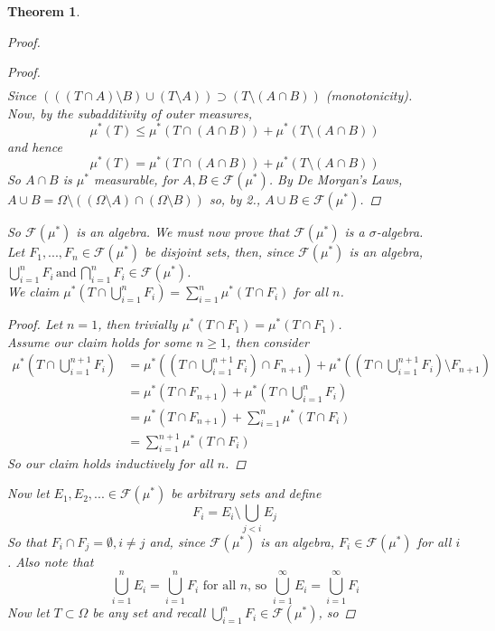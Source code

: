 \documentclass[12pt]{article}
\newtheorem{theorem}{Theorem}
\begin{document}
\begin{theorem}
\begin{proof}
\begin{enumerate}
\begin{proof}
\begin{align*}
					\end{align*}
					Since $(((T \cap A) \setminus B) \cup (T \setminus A)) \supset (T \setminus (A \cap B))$ (monotonicity).\\
					Now, by the subadditivity of outer measures,
					$$\mu^*(T) \le \mu^*(T \cap (A \cap B)) + \mu^*(T \setminus (A \cap B))$$
					and hence
					$$\mu^*(T) = \mu^*(T \cap (A \cap B)) + \mu^*(T \setminus (A \cap B))$$
					So $A \cap B$ is $\mu^*$ measurable, for $A, B \in \mathcal{F}(\mu^*)$.  By \emph{De Morgan's Laws}, $A \cup B = \Omega \setminus ((\Omega \setminus A) \cap (\Omega \setminus B))$ so, by 2., $A \cup B \in \mathcal{F}(\mu^*)$.
			\end{proof}
		\end{enumerate}
		So $\mathcal{F}(\mu^*)$ is an algebra.  We must now prove that $\mathcal{F}(\mu^*)$ is a $\sigma$-algebra.\\[11pt]
		Let $F_1, ... , F_n \in \mathcal{F}(\mu^*)$ be disjoint sets, then, since $\mathcal{F}(\mu^*)$ is an algebra, $\bigcup_{i=1}^n F_i \, \text{and} \, \bigcap_{i=1}^n F_i \in \mathcal{F}(\mu^*)$.\\
		We claim $\mu^*(T \cap \bigcup_{i=1}^n F_i) = \sum_{i=1}^n \mu^*(T \cap F_i)$ for all $n$.
		\begin{proof}
			Let $n = 1$, then trivially $\mu^*(T \cap F_1) = \mu^*(T \cap F_1)$.\\
			Assume our claim holds for some $n \ge 1$, then consider
			\begin{align*}
				\mu^*(T \cap \bigcup_{i=1}^{n+1} F_i) &= \mu^*((T \cap \bigcup_{i=1}^{n+1} F_i) \cap F_{n+1}) + \mu^*((T \cap \bigcup_{i=1}^{n+1} F_i) \setminus F_{n+1})\\
				&= \mu^*(T \cap F_{n+1}) + \mu^*(T \cap \bigcup_{i=1}^n F_i)\\
				&= \mu^*(T \cap F_{n+1}) + \sum_{i=1}^n \mu^*(T \cap F_i)\\
				&= \sum_{i=1}^{n+1} \mu^*(T \cap F_i)
			\end{align*}
			So our claim holds inductively for all $n$.
		\end{proof}
		Now let $E_1, E_2, ... \in \mathcal{F}(\mu^*)$ be arbitrary sets and define
		$$F_i = E_i \setminus \bigcup_{j < i} E_j$$
		So that $F_i \cap F_j = \emptyset, i \ne j$ and, since $\mathcal{F}(\mu^*)$ is an algebra, $F_i \in \mathcal{F}(\mu^*)$ for all $i$. Also note that
		$$\bigcup_{i=1}^n E_i = \bigcup_{i=1}^n F_i  \text{ for all $n$, so } \bigcup_{i=1}^\infty E_i = \bigcup_{i=1}^\infty F_i$$
		Now let $T \subset \Omega$ be any set and recall $\bigcup_{i=1}^n F_i \in \mathcal{F}(\mu^*)$, so

\end{proof}
\end{theorem}
\end{document}
